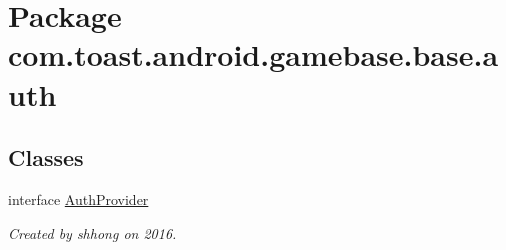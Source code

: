 \hypertarget{namespacecom_1_1toast_1_1android_1_1gamebase_1_1base_1_1auth}{}\section{Package com.\+toast.\+android.\+gamebase.\+base.\+auth}
\label{namespacecom_1_1toast_1_1android_1_1gamebase_1_1base_1_1auth}
\subsection*{Classes}
\begin{DoxyCompactItemize}
\item 
interface \hyperlink{interfacecom_1_1toast_1_1android_1_1gamebase_1_1base_1_1auth_1_1_auth_provider}{Auth\+Provider}
\begin{DoxyCompactList}\small\item\em Created by shhong on 2016. \end{DoxyCompactList}\end{DoxyCompactItemize}
